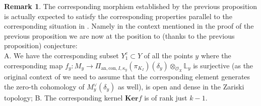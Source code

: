 \documentclass[12pt]{amsart}
\theoremstyle{definition}
\newtheorem{remark}[theorem]{Remark}
\numberwithin{equation}{section}
\begin{document}
\begin{remark}
The corresponding morphism established by the previous proposition is actually expected to satisfy the corresponding properties parallel to the corresponding situation in \cite[Theorem 6.3.9, Corollary 6.3.10]{KPX}. Namely in the context mentioned in the proof of the previous proposition we are now at the position to (thanks to the previous proposition) conjecture: \\
\indent A. We have the corresponding subset $Y_1^c\subset Y$ of all the points $y$ where the corresponding map $f_y:M_y\rightarrow \Pi_{\mathrm{an},\mathrm{con},I,\kappa_y}(\pi_{K_I})(\delta_y)\otimes_{\mathcal{O}_X}\mathbb{L}_y$ is surjective (as the original context of \cite{KPX} we need to assume that the corresponding element generates the zero-th cohomology of $M_y^\vee(\delta_y)$ as well), is open and dense in the Zariski topology; B. The corresponding kernel $\mathbf{Ker}f$ is of rank just $k-1$. 






\end{remark}	
\end{document}
